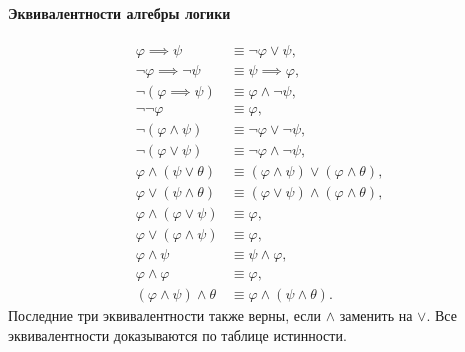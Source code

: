 \paragraph{Эквивалентности алгебры логики}
\begin{align}
    \varphi \implies \psi &\equiv \neg \varphi \lor \psi, \\
    \neg \varphi \implies \neg \psi &\equiv \psi \implies \varphi, \\
    \neg (\varphi \implies \psi) &\equiv \varphi \land \neg \psi, \\
    \neg \neg \varphi &\equiv \varphi, \\
    \neg (\varphi \land \psi) &\equiv \neg \varphi \lor \neg \psi, \\
    \neg (\varphi \lor \psi) &\equiv \neg \varphi \land \neg \psi, \\
    \varphi \land (\psi \lor \theta) &\equiv  (\varphi \land \psi) \lor (\varphi \land \theta), \\
    \varphi \lor (\psi \land \theta) &\equiv (\varphi \lor \psi) \land (\varphi \land \theta), \\
    \varphi \land (\varphi \lor \psi) &\equiv \varphi, \\
    \varphi \lor (\varphi \land \psi) &\equiv \varphi, \\
    \varphi \land \psi &\equiv \psi \land \varphi, \\
    \varphi \land \varphi &\equiv \varphi, \\
    (\varphi \land \psi) \land \theta &\equiv \varphi \land (\psi \land \theta).
 \end{align}
Последние три эквивалентности также верны, если $\land$ заменить на $\lor$.
Все эквивалентности доказываются по таблице истинности.


